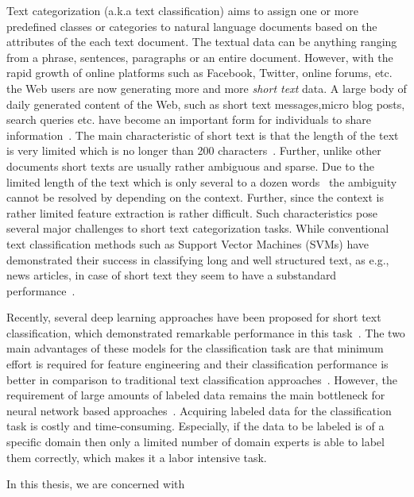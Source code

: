 Text categorization (a.k.a text classification) aims to assign one or more predefined classes or categories to natural language documents based on the attributes of the each text document. The textual data can be anything ranging from a phrase, sentences, paragraphs or an entire document. %
However, with the rapid growth of online platforms such as Facebook, Twitter, online forums, etc. the Web users are now generating more and more \textit{short text} data. A large body of daily generated content of the Web, such as short text messages,micro blog posts, search queries etc. have become an important form for individuals to share information~\cite{STTopicMemory}. The main characteristic of short text is that the length of the text is very limited which is no longer than 200 characters~\cite{song2014short}. Further, unlike other documents short texts are usually rather ambiguous and sparse. Due to the limited length of the text which is only several to a dozen words~\cite{song2014short} the ambiguity cannot be resolved by depending on the context. Further, since the context is rather limited feature extraction is rather difficult. Such characteristics pose several major challenges to short text categorization tasks. While conventional text classification methods such as Support Vector Machines (SVMs) have demonstrated their success in classifying long and well structured text, as e.g., news articles, in case of short text they seem to have a substandard performance~\cite{STTopicMemory}.


\par Recently, several deep learning approaches have been proposed for short text classification, which demonstrated remarkable performance in this task~\cite{sentiment/aaai/MaPC18,DBLP:conf/emnlp/ChenSBY17}. The two main advantages of these models for the classification task are that minimum effort is required for feature engineering and their classification performance is better in comparison to traditional text classification approaches~\cite{WeaklySupervised}. However, the requirement of large amounts of labeled data remains the main bottleneck for neural network based approaches~\cite{WeaklySupervised}. Acquiring labeled data for the classification task is costly and time-consuming. Especially, if the data to be labeled is of a specific domain then only a limited number of domain experts is able to label them correctly, which makes it a labor intensive task.

In this thesis, we are concerned with
